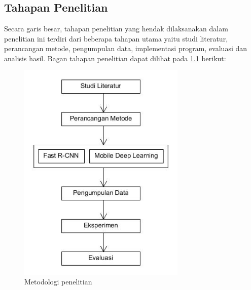 \chapter{\babTiga}
\section{Tahapan Penelitian}
Secara garis besar, tahapan penelitian yang hendak dilaksanakan dalam penelitian ini terdiri dari beberapa tahapan utama yaitu studi literatur, perancangan metode, pengumpulan data, implementasi program, evaluasi dan analisis hasil. Bagan tahapan penelitian dapat dilihat pada \ref{fig:metodologi_penelitian} berikut:

\begin{figure}[htp]
	\centering
	\includegraphics[width=8cm]{pics/metodologi_penelitian}
	\caption{Metodologi penelitian}
	\label{fig:metodologi_penelitian}
\end{figure}

